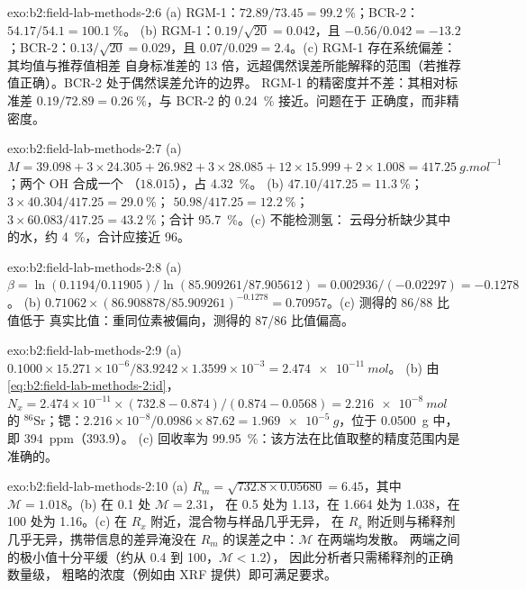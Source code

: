 \begin{solution}{exo:b2:field-lab-methods-2:6}
(a) RGM-1：$72.89/73.45 = \qty{99.2}{\percent}$；BCR-2：$54.17/54.1 = \qty{100.1}{\percent}$。
(b) RGM-1：$0.19/\sqrt{20} = 0.042$，且 $-0.56/0.042 = -13.2$；BCR-2：$0.13/\sqrt{20} = 0.029$，且
$0.07/0.029 = 2.4$。(c) RGM-1 存在系统偏差：其均值与推荐值相差
自身标准差的 13 倍，远超偶然误差所能解释的范围（若推荐值正确）。BCR-2 处于偶然误差允许的边界。
RGM-1 的精密度并不差：其相对标准差
$0.19/72.89 = \qty{0.26}{\percent}$，与 BCR-2 的 \qty{0.24}{\percent} 接近。问题在于
正确度，而非精密度。
\end{solution}

\begin{solution}{exo:b2:field-lab-methods-2:7}
(a) $M = 39.098 + 3 \times 24.305 + 26.982 + 3 \times 28.085 + 12 \times 15.999 + 2 \times 1.008 =
\qty{417.25}{g.mol^{-1}}$；两个 OH 合成一个 （$18.015$），占 \qty{4.32}{\percent}。
(b)  $47.10/417.25 = \qty{11.3}{\percent}$； $3 \times 40.304/417.25 =
\qty{29.0}{\percent}$； $50.98/417.25 = \qty{12.2}{\percent}$； $3 \times
60.083/417.25 = \qty{43.2}{\percent}$；合计 \qty{95.7}{\percent}。(c) 不能检测氢：
云母分析缺少其中的水，约 \qty{4}{\percent}，合计应接近
96。
\end{solution}

\begin{solution}{exo:b2:field-lab-methods-2:8}
(a) $\beta = \ln(0.1194/0.11905)/\ln(85.909261/87.905612) = 0.002936/(-0.02297) = -0.1278$。
(b) $0.71062 \times (86.908878/85.909261)^{-0.1278} = 0.70957$。(c) 测得的 86/88 比值低于
真实比值：重同位素被偏向，测得的 87/86 比值偏高。
\end{solution}

\begin{solution}{exo:b2:field-lab-methods-2:9}
(a) $0.1000 \times 15.271 \times 10^{-6}/83.9242 \times 1.3599 \times 10^{-3} = \qty{2.474e-11}{mol}$。
(b) 由 \eqref{eq:b2:field-lab-methods-2:id}，$N_x = 2.474 \times 10^{-11} \times (732.8 -
0.874)/(0.874 - 0.0568) = \qty{2.216e-8}{mol}$ 的 $^{86}\mathrm{Sr}$；锶：$2.216 \times
10^{-8}/0.0986 \times 87.62 = \qty{1.969e-5}{g}$，位于 \qty{0.0500}{g} 中，即 \qty{394}{ppm}（393.9）。
(c) 回收率为 \qty{99.95}{\percent}：该方法在比值取整的精度范围内是准确的。
\end{solution}

\begin{solution}{exo:b2:field-lab-methods-2:10}
(a) $R_m = \sqrt{732.8 \times 0.05680} = 6.45$，其中 $\mathcal M = 1.018$。(b) 在 0.1 处 $\mathcal M = 2.31$，
在 0.5 处为 1.13，在 1.664 处为 1.038，在 100 处为 1.16。(c) 在 $R_x$ 附近，混合物与样品几乎无异，
在 $R_s$ 附近则与稀释剂几乎无异，携带信息的差异淹没在 $R_m$ 的误差之中：$\mathcal M$ 在两端均发散。
两端之间的极小值十分平缓（约从 0.4 到 100，$\mathcal M < 1.2$），
因此分析者只需稀释剂的正确数量级，
粗略的浓度（例如由 XRF 提供）即可满足要求。
\end{solution}

